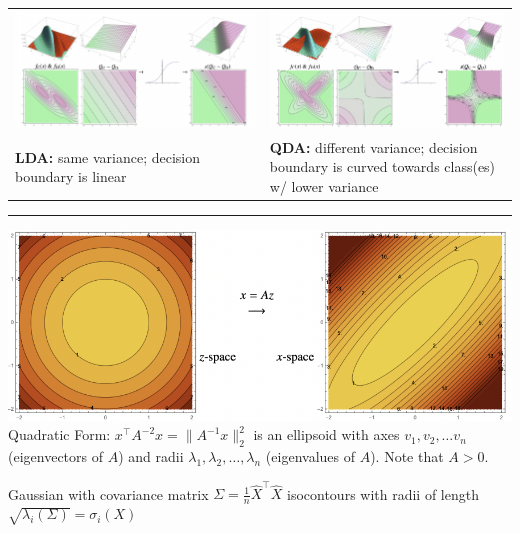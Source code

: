 \documentclass[10pt,landscape]{article}
\begin{document}
\begin{multicols}{3}
\begin{tabular}{@{}p{}@{\hskip 0.5cm}@{}p{}@{}}
\includegraphics[width=\linewidth/8*7]{LDA_Isocontours.png} & \includegraphics[width=\linewidth/8*7]{QDA_Isocontours.png} \\
 \textbf{LDA:} same variance; decision boundary is linear & \textbf{QDA:} different variance; decision boundary is curved towards class(es) w/ lower variance 
\end{tabular} \vspace{0.5em} 
\hrule \vspace{0.5em}
 \includegraphics[width=\linewidth]{Quadratic_Isosurface.png}
 Quadratic Form: $x^{\top}A^{-2}x = \| A^{-1}x\|_2^2$ is an ellipsoid with axes $v_1, v_2, \dots v_n$ (eigenvectors of $A$) and radii $\lambda_1, \lambda_2, \dots, \lambda_n$ (eigenvalues of $A$). Note that $A > 0$.
 
 Gaussian with covariance matrix $\Sigma = \frac{1}{n} \hat{X}^{\top} \hat{X}$ isocontours with radii of length $\sqrt{\lambda_i(\Sigma)} = \sigma_i(X)$


\end{multicols}
\end{document}
